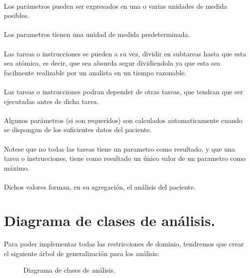 \documentclass[a4paper,10pt]{article}
\begin{document}
\paragraph{}
Los parámetros pueden ser expresados en una o varias unidades de medida posibles.

\paragraph{}
Los parametros tienen una unidad de medida predeterminada.

\paragraph{}
Las tareas o instrucciones se pueden a su vez, dividir en subtareas hasta que esta sea atómica, es decir, que sea absurda segur dividiendola ya que esta sea facilmente realizable por un analista en un tiempo razonable.

\paragraph{}
Las tareas o instrucciones podran depender de otras tareas, que tendran que ser ejecutadas antes de dicha tarea.

\paragraph{}
Algunos parámetros (si son requeridos) son calculados automaticamente cuando se dispongan de los suficientes datos del paciente.

\paragraph{}
Notese que no todas las tareas tiene  un parametro como resultado, y que una tarea o instrucciones, tiene como resultado un único valor de un parametro como máximo.

\paragraph{}
Dichos valores forman, en su agregación, el análisis del paciente.

\pagebreak

\section{Diagrama de clases de análisis.}
\paragraph{}
Para poder implementar todas las restricciones de dominio, tendremos que crear el siguiente árbol de generalización para los análisis:\\
\begin{figure}[hbt]
	\scalebox{0.39}{}
	\caption{Diagrama de clases de análisis.}
	\label{fig:diagramaanalisis}
\end{figure}
\end{document}

